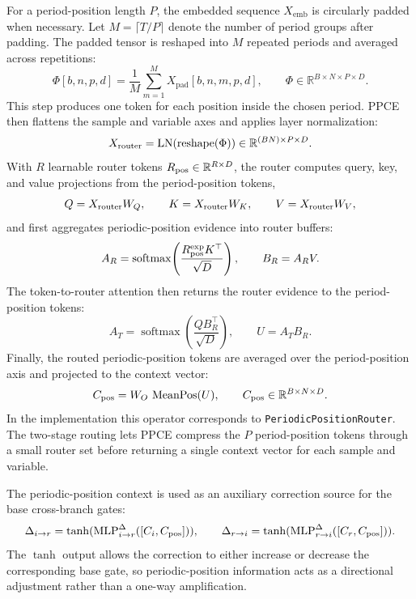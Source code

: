 \documentclass[a4paper,fleqn]{cas-sc}
\begin{document}
For a period-position length $P$, the embedded sequence $X_{\text{emb}}$ is circularly padded when necessary. Let $M=\lceil T/P\rceil$ denote the number of period groups after padding. The padded tensor is reshaped into $M$ repeated periods and averaged across repetitions:
\begin{equation}
\Phi[b,n,p,d] =
\frac{1}{M}\sum_{m=1}^{M} X_{\text{pad}}[b,n,m,p,d],
\qquad
\Phi \in \mathbb{R}^{B \times N \times P \times D}.
\end{equation}
This step produces one token for each position inside the chosen period. PPCE then flattens the sample and variable axes and applies layer normalization:
\begin{equation}
X_{\rm router} =
\operatorname{LN}(\operatorname{reshape}(\Phi))
\in \mathbb{R}^{(BN) \times P \times D}.
\end{equation}
With $R$ learnable router tokens $R_{\rm pos}\in\mathbb{R}^{R\times D}$, the router computes query, key, and value projections from the period-position tokens,
\begin{equation}
Q=X_{\rm router}W_Q,\qquad K=X_{\rm router}W_K,\qquad V=X_{\rm router}W_V,
\end{equation}
and first aggregates periodic-position evidence into router buffers:
\begin{equation}
A_R = \operatorname{softmax}\!\left(\frac{R_{\rm pos}^{\rm exp}K^\top}{\sqrt{D}}\right),
\qquad
B_R = A_R V.
\end{equation}
The token-to-router attention then returns the router evidence to the period-position tokens:
\begin{equation}
A_T = \operatorname{softmax}\!\left(\frac{Q B_R^\top}{\sqrt{D}}\right),
\qquad
U = A_T B_R.
\end{equation}
Finally, the routed periodic-position tokens are averaged over the period-position axis and projected to the context vector:
\begin{equation}
C_{\rm pos} = W_O\,\operatorname{MeanPos}(U),
\qquad
C_{\rm pos}\in\mathbb{R}^{B\times N\times D}.
\end{equation}
In the implementation this operator corresponds to \texttt{PeriodicPositionRouter}. The two-stage routing lets PPCE compress the $P$ period-position tokens through a small router set before returning a single context vector for each sample and variable.

The periodic-position context is used as an auxiliary correction source for the base cross-branch gates:
\begin{equation}
\Delta_{i\to r} = \tanh(\operatorname{MLP}_{i\to r}^{\Delta}([C_i, C_{\rm pos}])), \qquad
\Delta_{r\to i} = \tanh(\operatorname{MLP}_{r\to i}^{\Delta}([C_r, C_{\rm pos}])).
\end{equation}
The $\tanh$ output allows the correction to either increase or decrease the corresponding base gate, so periodic-position information acts as a directional adjustment rather than a one-way amplification.
\end{document}

